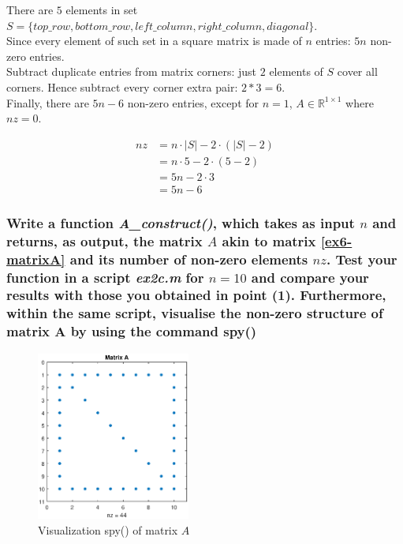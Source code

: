 \documentclass[unicode,11pt,a4paper,oneside,numbers=endperiod,openany]{scrartcl}
\begin{document}
There are $5$ elements in set $S = \{top\_row, bottom\_row, left\_column, right\_column, diagonal\}$. \\
Since every element of such set in a square matrix is made of $n$ entries:
$5n$ non-zero entries. \\
Subtract duplicate entries from matrix corners: just $2$ elements of $S$ cover all corners.
Hence subtract every corner extra pair: $2 * 3 = 6$. \\
Finally, there are $5n - 6$ non-zero entries, except for $n = 1$, $A \in \mathbb{R}^{1 \times 1}$ where $nz = 0$.

\begin{equation} \label{eq1}
    \begin{split}
        nz  & = n \cdot |S| - 2 \cdot (|S| - 2) \\
        & = n \cdot 5 - 2 \cdot (5 - 2) \\
        & = 5n - 2 \cdot 3 \\
        & = 5n - 6
    \end{split}
\end{equation}

\subsubsection{Write a function \textit{A\_construct()}, which takes as input $n$ and returns,
    as output, the matrix $A$ akin to matrix \ref{ex6-matrixA} and its number of non-zero elements $nz$.
    Test your function in a script \textit{ex2c.m} for $n = 10$ and compare your results
    with those you obtained in point (1).
    Furthermore, within the same script, visualise the non-zero structure of matrix A by using the command spy()}

\begin{figure}[H]
    \centering
    \includegraphics[width=0.45\textwidth]{figures/ex6p3_spy}
    \caption{Visualization spy() of matrix $A$}
    \label{fig:ex6p3_spy}
\end{figure}
\end{document}
